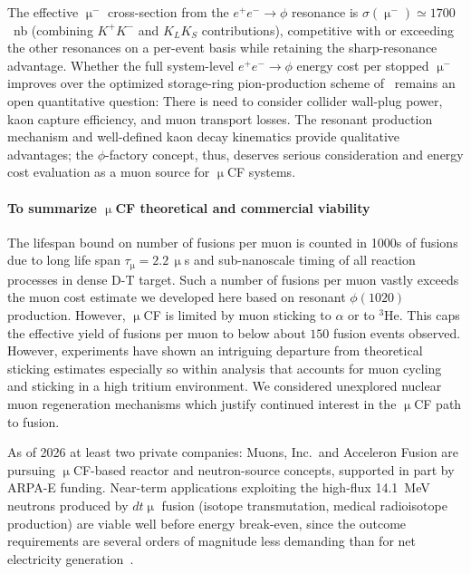 \documentclass[particles,article,accept,pdftex,moreauthors]{Definitions/mdpi}
\begin{document}
The effective $\upmu^-$ cross-section from the $e^+e^-\to \phi$ resonance is $\sigma(\upmu^-)\simeq 1700$~nb (combining $K^+K^-$ and $K_LK_S$ contributions), competitive with or exceeding the other resonances on a per-event basis while retaining the sharp-resonance advantage. Whether the full system-level $e^+e^-\to \phi$ energy cost per stopped $\upmu^-$ improves over the optimized storage-ring pion-production scheme of~\cite{Rafelski:1991DOE} remains an open quantitative question: There is need to consider collider wall-plug power, kaon capture efficiency, and muon transport losses. The resonant production mechanism and well-defined kaon decay kinematics provide qualitative advantages; the $\phi$-factory concept, thus, deserves serious consideration and energy cost evaluation as a muon source for $\upmu$CF systems.

\paragraph*{\bf To summarize $\upmu$CF theoretical and commercial viability}
The lifespan bound on number of fusions per muon is counted in 1000s of fusions due to long life span $\tau_\upmu=2.2\,\upmu$s and sub-nanoscale timing of all reaction processes in dense D-T target. Such a number of fusions per muon vastly exceeds the muon cost estimate we developed here based on resonant $\phi(1020)$ production. However, $\upmu$CF is limited by muon sticking to $\alpha$ or to ${}^3\mathrm{He}$. This caps the effective yield of fusions per muon to below about $150$ fusion events observed. However, experiments have shown an intriguing departure from theoretical sticking estimates especially so within analysis that accounts for muon cycling and sticking in a high tritium environment. We considered unexplored nuclear muon regeneration mechanisms which justify continued interest in the $\upmu$CF path to fusion.

As of 2026 at least two private companies: Muons, Inc.\ and Acceleron Fusion are pursuing $\upmu$CF-based reactor and neutron-source concepts, supported in part by ARPA-E funding. Near-term applications exploiting the high-flux 14.1~MeV neutrons produced by $dt\upmu$ fusion (isotope transmutation, medical radioisotope production) are viable well before energy break-even, since the outcome requirements are several orders of magnitude less demanding than for net electricity generation~\cite{Kamimura:2021msf,Yamashita:2022rtu}. 

\end{document}
